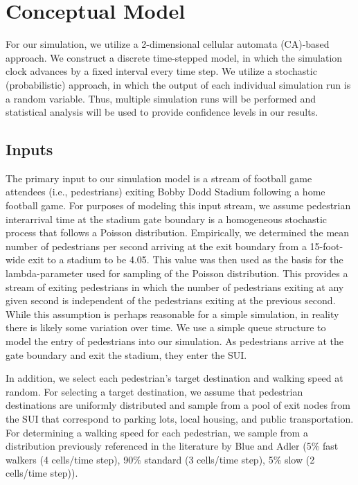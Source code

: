 \documentclass[12pt]{article}
\begin{document}
\section{Conceptual Model}
For our simulation, we utilize a 2-dimensional cellular automata (CA)-based
approach. We construct a discrete time-stepped model, in which the simulation
clock advances by a fixed interval every time step. We utilize a stochastic
(probabilistic) approach, in which the output of each individual simulation
run is a random variable. Thus, multiple simulation runs will be performed and
statistical analysis will be used to provide confidence levels in our results.

\subsection{Inputs}
The primary input to our simulation model is a stream of football game attendees
(i.e., pedestrians) exiting Bobby Dodd Stadium following a home football game.
For purposes of modeling this input stream, we assume pedestrian interarrival
time at the stadium gate boundary is a homogeneous stochastic process that
follows a Poisson distribution. Empirically, we determined the mean number of
pedestrians per second arriving at the exit boundary from a 15-foot-wide exit to
a stadium to be 4.05. This value was then used as the basis for the
lambda-parameter used for sampling of the Poisson distribution. This provides
a stream of exiting pedestrians in which the number of pedestrians exiting at
any given second is independent of the pedestrians exiting at the previous
second. While this assumption is perhaps reasonable for a simple simulation, in
reality there is likely some variation over time. We use a simple queue
structure to model the entry of pedestrians into our simulation. As pedestrians
arrive at the gate boundary and exit the stadium, they enter the SUI.

In addition, we select each pedestrian's target destination and walking
speed at random. For selecting a target destination, we assume that pedestrian
destinations are uniformly distributed and sample from a pool of exit nodes
from the SUI that correspond to parking lots, local housing, and public
transportation. For determining a walking speed for each pedestrian, we sample
from a distribution previously referenced in the literature by Blue and Adler
\cite{blue2001cellular} (5\% fast walkers (4 cells/time step), 90\% standard
(3 cells/time step), 5\% slow (2 cells/time step)).
\end{document}
